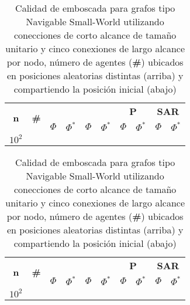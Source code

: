 \begin{table}
	\caption{Calidad de emboscada para grafos tipo Navigable Small-World 
	utilizando conecciones de corto alcance de tamaño unitario y cinco conexiones
	de largo alcance por nodo, n\'umero de agentes (\textbf{\#}) ubicados en
	posiciones aleatorias distintas (arriba) y compartiendo la posici\'on
	inicial (abajo)}
	\label{tab:ambush_rgg}
	\centering
	\begin{small}
		\setlength{\tabcolsep}{4pt}
		\begin{tabular}{|c|c|cc|cc|cc|cc|}
			\hline
			\multirow{2}{*}{\textbf{n}} &
			\multirow{2}{*}{\textbf{\#}} &
			\multicolumn{2}{c|}{\textbf{\astar}} &
			\multicolumn{2}{c|}{\textbf{\ambush}} &
			\multicolumn{2}{c|}{\textbf{P}} &
			\multicolumn{2}{c|}{\textbf{SAR}}\\
			& & $\Phi$ & $\Phi^*$ & $\Phi$ & $\Phi^*$&
			$\Phi$ & $\Phi^*$& $\Phi$ & $\Phi^*$\\
			\hline
			\multirow{4}{*}{$10^2$}
			\\
			\hline
			\multirow{4}{*}{$10^3$}
			 \\
			 \hline
			\multirow{4}{*}{$10^4$}
			 \\
			 \hline
		\end{tabular}
		
		\bigskip
		\begin{tabular}{|c|c|cc|cc|cc|cc|}
			\hline
			\multirow{2}{*}{\textbf{n}} &
			\multirow{2}{*}{\textbf{\#}} &
			\multicolumn{2}{c|}{\textbf{\astar}} &
			\multicolumn{2}{c|}{\textbf{\ambush}} &
			\multicolumn{2}{c|}{\textbf{P}} &
			\multicolumn{2}{c|}{\textbf{SAR}}\\
			& & $\Phi$ & $\Phi^*$ & $\Phi$ & $\Phi^*$&
			$\Phi$ & $\Phi^*$& $\Phi$ & $\Phi^*$\\
			\hline
			\multirow{4}{*}{$10^2$}
			 \\
			\hline
			\multirow{4}{*}{$10^3$}
			 \\
			 \hline
			\multirow{4}{*}{$10^4$}
			 \\
			 \hline
		\end{tabular}
	\end{small}
\end{table}
